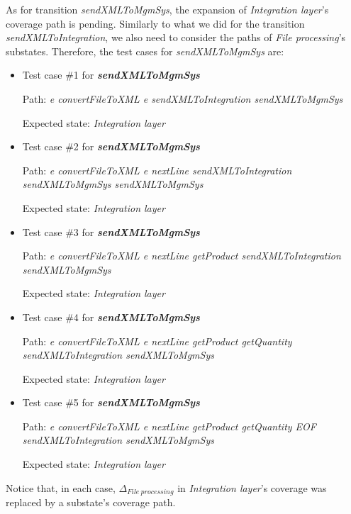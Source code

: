 As for transition \textit{sendXMLToMgmSys}, the expansion of \textit{Integration layer}'s coverage path is pending. Similarly to what we did for the transition \textit{sendXMLToIntegration}, we also need to consider the paths of \textit{File processing}'s substates. Therefore, the test cases for \textit{sendXMLToMgmSys} are:

\begin{itemize}

\item Test case \#1 for \textit{\textbf{sendXMLToMgmSys}}

Path: \textit{e convertFileToXML e sendXMLToIntegration sendXMLToMgmSys}

Expected state: \textit{Integration layer}

\item Test case \#2 for \textit{\textbf{sendXMLToMgmSys}}

Path: \textit{e convertFileToXML e  nextLine sendXMLToIntegration sendXMLToMgmSys sendXMLToMgmSys}

Expected state: \textit{Integration layer}


\item Test case \#3 for \textit{\textbf{sendXMLToMgmSys}}

Path: \textit{e convertFileToXML e  nextLine  getProduct sendXMLToIntegration sendXMLToMgmSys}

Expected state: \textit{Integration layer}

\item Test case \#4 for \textit{\textbf{sendXMLToMgmSys}}

Path: \textit{e convertFileToXML e  nextLine  getProduct  getQuantity sendXMLToIntegration sendXMLToMgmSys}

Expected state: \textit{Integration layer}

\item Test case \#5 for \textit{\textbf{sendXMLToMgmSys}}

Path: \textit{e convertFileToXML e  nextLine  getProduct  getQuantity EOF sendXMLToIntegration sendXMLToMgmSys}

Expected state: \textit{Integration layer}

\end{itemize}

Notice that, in each case, $\Delta_{File\ processing}$ in \textit{Integration layer}'s coverage was replaced by a substate's coverage path.

